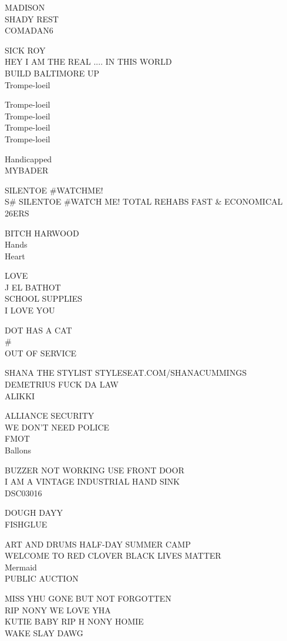 \documentclass[10pt,letterpaper]{article}
\begin{document}
MADISON\\
SHADY REST\\
COMADAN6

SICK ROY\\
HEY I AM THE REAL .... IN THIS WORLD\\
BUILD BALTIMORE UP\\
Trompe{-}loeil

Trompe{-}loeil\\
Trompe{-}loeil\\
Trompe{-}loeil\\
Trompe{-}loeil

Handicapped\\
MYBADER

SILENTOE \#WATCHME!\\
S\# SILENTOE \#WATCH ME! TOTAL REHABS FAST \& ECONOMICAL\\
26ERS

BITCH HARWOOD\\
Hands\\
Heart

LOVE\\
J EL BATHOT\\
SCHOOL SUPPLIES\\
I LOVE YOU

DOT HAS A CAT\\
\#\\
OUT OF SERVICE

SHANA THE STYLIST STYLESEAT.COM/SHANACUMMINGS\\
DEMETRIUS FUCK DA LAW\\
ALIKKI

ALLIANCE SECURITY\\
WE DON'T NEED POLICE\\
FMOT\\
Ballons

BUZZER NOT WORKING USE FRONT DOOR\\
I AM A VINTAGE INDUSTRIAL HAND SINK\\
DSC03016

DOUGH DAYY\\
FISHGLUE

ART AND DRUMS HALF{-}DAY SUMMER CAMP\\
WELCOME TO RED CLOVER BLACK LIVES MATTER\\
Mermaid\\
PUBLIC AUCTION

MISS YHU GONE BUT NOT FORGOTTEN\\
RIP NONY WE LOVE YHA\\
KUTIE BABY RIP H NONY HOMIE\\
WAKE SLAY DAWG
\end{document}
